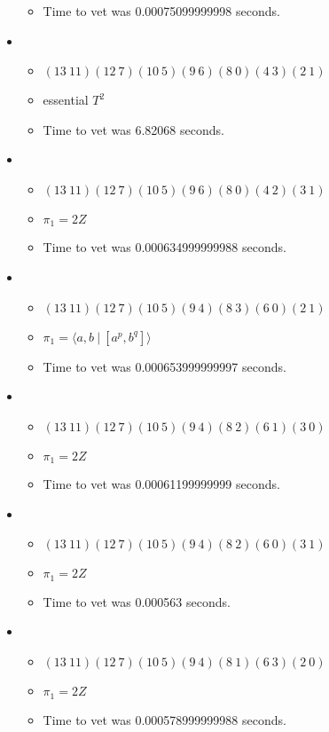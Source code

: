 \documentclass{article}
\begin{document}
\begin{itemize}
\begin{itemize}
      \item Time to vet was 0.00075099999998 seconds.
\end{itemize}
\item \begin{itemize}
      \item $(13\ 11)(12\ 7)(10\ 5)(9\ 6)(8\ 0)(4\ 3)(2\ 1)$
      \item essential $T^2$
      \item Time to vet was 6.82068 seconds.
\end{itemize}
\item \begin{itemize}
      \item $(13\ 11)(12\ 7)(10\ 5)(9\ 6)(8\ 0)(4\ 2)(3\ 1)$
      \item $\pi_1 =2 Z$
      \item Time to vet was 0.000634999999988 seconds.
\end{itemize}
\item \begin{itemize}
      \item $(13\ 11)(12\ 7)(10\ 5)(9\ 4)(8\ 3)(6\ 0)(2\ 1)$
      \item $\pi_1 = \langle a,b\ |\ [a^p,b^q]\rangle$
      \item Time to vet was 0.000653999999997 seconds.
\end{itemize}
\item \begin{itemize}
      \item $(13\ 11)(12\ 7)(10\ 5)(9\ 4)(8\ 2)(6\ 1)(3\ 0)$
      \item $\pi_1 =2 Z$
      \item Time to vet was 0.00061199999999 seconds.
\end{itemize}
\item \begin{itemize}
      \item $(13\ 11)(12\ 7)(10\ 5)(9\ 4)(8\ 2)(6\ 0)(3\ 1)$
      \item $\pi_1 =2 Z$
      \item Time to vet was 0.000563 seconds.
\end{itemize}
\item \begin{itemize}
      \item $(13\ 11)(12\ 7)(10\ 5)(9\ 4)(8\ 1)(6\ 3)(2\ 0)$
      \item $\pi_1 =2 Z$
      \item Time to vet was 0.000578999999988 seconds.

\end{itemize}
\end{itemize}
\end{document}
